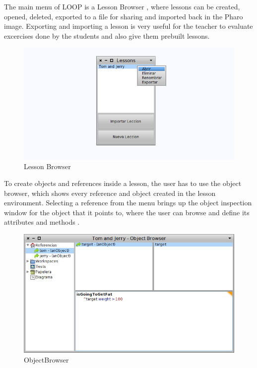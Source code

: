 \documentclass{sigplanconf}
\begin{document}
The main menu of LOOP is a Lesson Browser , where lessons can be created, opened, deleted, exported to a file for sharing and imported back in the Pharo image. Exporting and importing a lesson is very useful for the teacher to evaluate excercises done by the students and also give them prebuilt lessons.
\begin{figure}[h]
 \centering
 \includegraphics[scale=.35]{./images/lessonBrowser.png}
 \caption{Lesson Browser}
 \label{fig:lessonBrowser}
\end{figure}

To create objects and references inside a lesson, the user has to use the object browser, which shows every reference and object created in the lesson environment. Selecting a reference from the menu brings up the object inspection window for the object that it points to, where the user can browse and define its attributes and methods . 
\begin{figure}[h]
 \centering
 \includegraphics[scale=.35]{./images/objectBrowser.png}
 \caption{ObjectBrowser}
 \label{fig:objectBrowser}
\end{figure}
\end{document}
